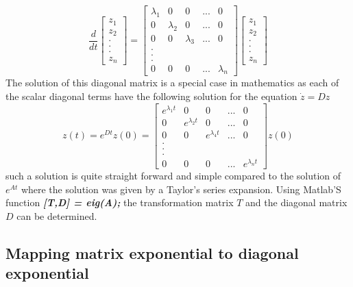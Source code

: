 \begin{equation}
	\frac{d}{dt}\begin{bmatrix}
		z_{1} \\ z_{2} \\ . \\ . \\ . \\ z_{n}
	\end{bmatrix} = \begin{bmatrix}
		\lambda_{1} & 0 & 0 & ... & 0 \\ 0 & \lambda_{2} & 0 & ... & 0 \\ 0 & 0 & \lambda_{3} & ... & 0 \\ . \\. \\. \\ 0 & 0 & 0 & ... & \lambda_{n}
	\end{bmatrix}\begin{bmatrix}
	z_{1} \\ z_{2} \\ . \\ . \\ . \\ z_{n}
	\end{bmatrix}
\end{equation}
The solution of this diagonal matrix is a special case in mathematics as each of the scalar diagonal terms have the following solution for the equation $\dot{z} = Dz$
\begin{equation}
	z(t) = e^{Dt}z(0) = \begin{bmatrix}
		e^{\lambda_{1} t} & 0 & 0 & ... & 0 \\ 0 & e^{\lambda_{2} t} & 0 & ... & 0 \\ 0 & 0 & e^{\lambda_{4} t} & ... & 0 \\ . \\. \\. \\ 0 & 0 & 0 & ... & e^{\lambda_{n} t}
	\end{bmatrix}z(0)
\end{equation}
such a solution is quite straight forward and simple compared to the solution of $e^{At}$ where the solution was given by a Taylor's series expansion. Using Matlab'S function \textbf{\textit{[T,D] = eig(A);}} the transformation matrix $T$ and the diagonal matrix $D$ can be determined.

\subsection{Mapping matrix exponential to diagonal exponential}

